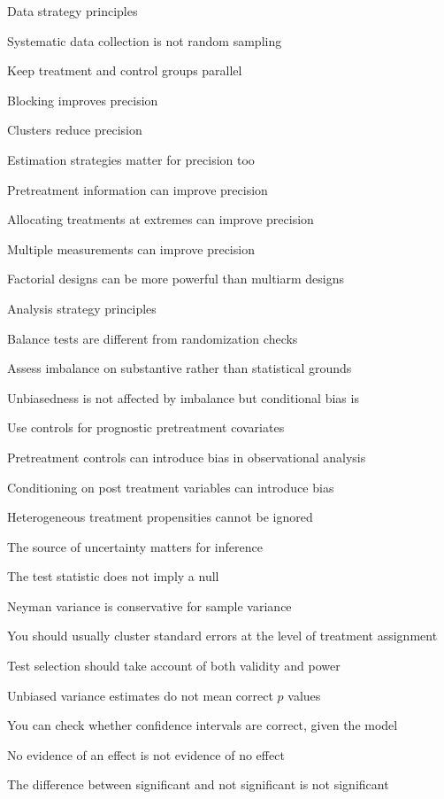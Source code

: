\documentclass[11pt]{article}
\begin{document}
\begin{legal}
\begin{legal}
		\item Data strategy principles 

		\begin{legal}				
		\item	Systematic data collection is not random sampling
		\item	Keep treatment and control groups parallel
		\item	Blocking improves precision
		\item	Clusters reduce  precision
		\item	Estimation strategies matter for precision too
		\item	Pretreatment information can improve precision
		\item	Allocating treatments at extremes can improve precision
		\item	Multiple measurements can improve precision
		\item	Factorial designs can be more powerful than multiarm designs
		\end{legal}
		
    \item Analysis strategy principles 
		
    \begin{legal}
		\item 	Balance tests are different from randomization checks 
		\item   Assess imbalance on substantive rather than statistical grounds
		\item 	Unbiasedness is not affected by imbalance but conditional bias is
		\item 	Use controls for prognostic pretreatment covariates
		\item 	Pretreatment controls can introduce bias in observational analysis
		\item 	Conditioning on post treatment variables can introduce bias
		\item 	Heterogeneous treatment propensities cannot be ignored
		\item 	The source of uncertainty matters for inference
		\item 	The test statistic does not imply a null
		\item 	Neyman variance is conservative for sample variance
		\item 	You should usually cluster standard errors at the level of treatment assignment
		\item	Test selection should take account of both validity and power 
		\item	Unbiased variance estimates do not mean correct $p$ values
		\item	You can check whether confidence intervals are correct, given the model 
		\item	No evidence of an effect is not evidence of no effect
		\item	The difference between significant and not significant is not significant
		\end{legal}
		

\end{legal}
\end{legal}
\end{document}
